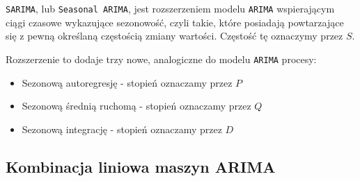 \documentclass[12pt]{article}
\begin{document}
\texttt{SARIMA}, lub \texttt{Seasonal ARIMA}, jest rozszerzeniem modelu \texttt{ARIMA} wspierającym ciągi czasowe wykazujące sezonowość, czyli takie, które posiadają powtarzające się z pewną określaną częstością zmiany wartości. Częstość tę oznaczymy przez $S$.

Rozszerzenie to dodaje trzy nowe, analogiczne do modelu \texttt{ARIMA} procesy:
\begin{itemize}
    \item Sezonową autoregresję - stopień oznaczamy przez $P$
    \item Sezonową średnią ruchomą - stopień oznaczamy przez $Q$
    \item Sezonową integrację - stopień oznaczamy przez $D$
\end{itemize}

\subsection{Kombinacja liniowa maszyn ARIMA}
\end{document}
